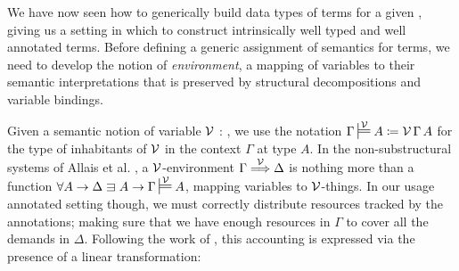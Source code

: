 We have now seen how to generically build data types of terms for a
given , giving us a setting in which to construct
intrinsically well typed and well annotated terms. Before defining a
generic assignment of semantics for terms, we need to develop the
notion of \emph{environment}, a mapping of variables to their semantic
interpretations that is preserved by structural decompositions and
variable bindings.

Given a semantic notion of variable $\mathcal V$ : , we
use the notation $\Gamma \sdtstile{}\V A \coloneqq \V\,\Gamma\,A$ for
the type of inhabitants of $\mathcal V$ in the context $\Gamma$ at type
$A$. In the non-substructural systems of Allais et al. \cite{AACMM21},
a $\mathcal V$-environment $\Gamma \stackrel{\mathcal V}\Longrightarrow \Delta$ is nothing more than a
function $\forall A \to \Delta \sqni A \to \Gamma \sdtstile{}\V A$,
mapping variables to $\mathcal V$-things. In our usage annotated setting
though, we must correctly distribute resources tracked by the
annotations; making sure that we have enough resources in $\Gamma$ to
cover all the demands in $\Delta$. Following the work of \citet{WA20},
this accounting is expressed via the presence of a linear
transformation:








